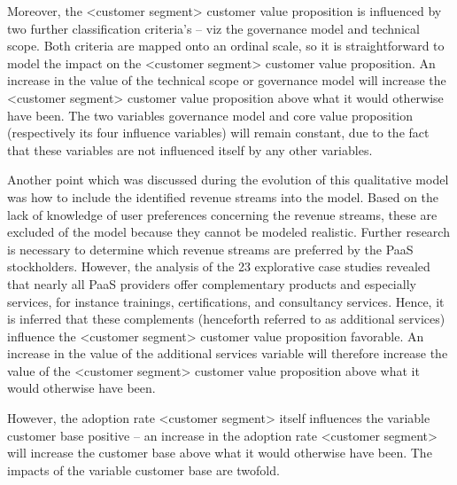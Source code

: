 Moreover, the <customer segment> customer value proposition is influenced by two further classification criteria's -- viz the governance model and technical scope. Both criteria are mapped onto an ordinal scale, so it is straightforward to model the impact on the <customer segment> customer value proposition. An increase in the value of the technical scope or governance model will increase the <customer segment> customer value proposition above what it would otherwise have been. The two variables governance model and core value proposition (respectively its four influence variables) will remain constant, due to the fact that these variables are not influenced itself by any other variables.

Another point which was discussed during the 	evolution of this qualitative model was how to include the identified revenue streams into the model. Based on the lack of knowledge of user preferences concerning the revenue streams, these are excluded of the model because they cannot be modeled realistic. Further research is necessary to determine which revenue streams are preferred by the \ac{PaaS} stockholders. However, the analysis of the 23 explorative case studies revealed that nearly all \ac{PaaS} providers offer complementary products and especially services, for instance trainings, certifications, and consultancy services. Hence, it is inferred that these complements (henceforth referred to as additional services) influence the <customer segment> customer value proposition favorable. An increase in the value of the additional services variable will therefore increase the value of the <customer segment> customer value proposition above what it would otherwise have been.

However, the adoption rate <customer segment> itself influences the variable customer base positive -- an increase in the adoption rate <customer segment> will increase the customer base above what it would otherwise have been. The impacts of the variable customer base are twofold. 

